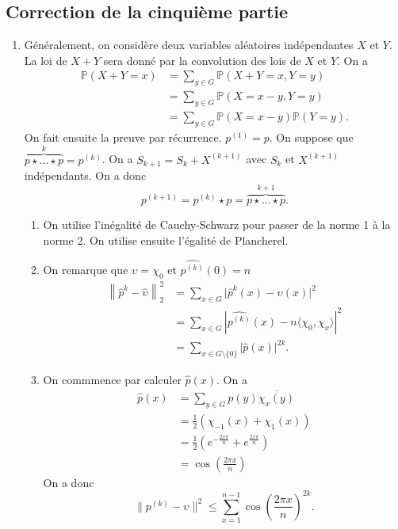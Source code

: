 \documentclass{article}[a4paper]
\newcommand{\norm}[1]{\lVert#1\rVert}
\newcommand{\braket}[2]{\langle #1,#2\rangle}
\renewcommand{\P}{\mathbb{P}}
\begin{document}
\subsection*{Correction de la cinquième partie}
\begin{enumerate}
    \item Généralement, on considère deux variables aléatoires indépendantes \(X\) et \(Y\). 
    La loi de \(X+Y\) sera donné par la convolution des lois de \(X\) et \(Y\). On a 
    \begin{align*}
        \P(X+Y = x) &= \sum_{y\in G} \P(X+Y = x,Y = y)\\
        &= \sum_{y\in G} \P(X = x-y,Y = y)\\
        &= \sum_{y\in G} \P(X = x-y)\P(Y = y).
    \end{align*}
    On fait ensuite la preuve par récurrence. \(p^{(1)} = p\). On suppose que 
    \(\overbrace{p\star \dots \star p}^k = p^{(k)}\). On a \(S_{k+1} = S_k + X^{(k+1)}\) avec 
    \(S_k\) et \(X^{(k+1)}\) indépendants. On a donc
    \begin{equation*}
        p^{(k+1)} = p^{(k)}\star p = \overbrace{p\star \dots \star p}^{k+1}.
    \end{equation*}
    \begin{enumerate}
        \item On utilise l'inégalité de Cauchy-Schwarz pour passer de la norme 1 à la norme 2.
        On utilise ensuite l'égalité de Plancherel.
        \item On remarque que \(\upsilon = \chi_0\) et \(\hat{p^{(k)}}(0) = n\)
        \begin{align*}
        \left\|\hat{p}^k - \widehat{\upsilon}\right\|_2^2 &= \sum_{x\in G} \lvert \hat{p}^k(x) - \widehat{\upsilon}(x)\rvert^2\\
        &= \sum_{x\in G}\left\lvert \hat{p^{(k)}}(x) - n\braket{\chi_0}{\chi_x} \right\rvert^2\\
        & = \sum_{x\in G\setminus\{0\}} \lvert \hat{p}(x)\rvert^{2k}.
        \end{align*}
        \item On commmence par calculer \(\hat{p}(x)\). On a 
        \begin{align*}
            \hat{p}(x) &= \sum_{y\in G} p(y)\overline{\chi_x(y)}\\
            &= \frac{1}{2}\left(\chi_{-1}(x) + \chi_1(x)\right)\\
            &= \frac{1}{2}\left(e^{-\frac{2x\pi}{n}}+ e^{\frac{2x\pi}{n}}\right)\\
            &= \cos\left(\frac{2\pi x}{n}\right)
        \end{align*}
        On a donc 
        \begin{equation*}
            \norm{p^{(k)}-\upsilon}^2 \le \sum_{x = 1}^{n-1}\cos\left(\frac{2\pi x}{n}\right)^{2k}.
        \end{equation*}
    \end{enumerate}
\end{enumerate}
\end{document}
